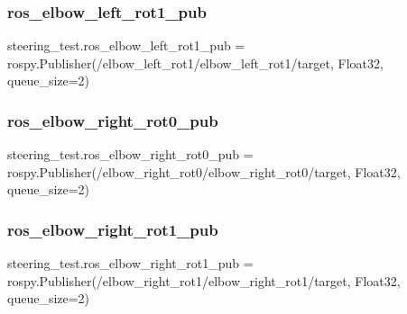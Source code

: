 \mbox{\label{namespacesteering__test_a5791cb7f60a031447e40dcdfdca9b56f}} 
\subsubsection{\texorpdfstring{ros\_elbow\_left\_rot1\_pub}{ros\_elbow\_left\_rot1\_pub}}
{\footnotesize\ttfamily steering\+\_\+test.\+ros\+\_\+elbow\+\_\+left\+\_\+rot1\+\_\+pub = rospy.\+Publisher(\textquotesingle{}/elbow\+\_\+left\+\_\+rot1/elbow\+\_\+left\+\_\+rot1/target\textquotesingle{}, Float32, queue\+\_\+size=2)}

\mbox{\label{namespacesteering__test_a8b72aa5250d03bc64a0ae00f7fb94e45}} 
\subsubsection{\texorpdfstring{ros\_elbow\_right\_rot0\_pub}{ros\_elbow\_right\_rot0\_pub}}
{\footnotesize\ttfamily steering\+\_\+test.\+ros\+\_\+elbow\+\_\+right\+\_\+rot0\+\_\+pub = rospy.\+Publisher(\textquotesingle{}/elbow\+\_\+right\+\_\+rot0/elbow\+\_\+right\+\_\+rot0/target\textquotesingle{}, Float32, queue\+\_\+size=2)}

\mbox{\label{namespacesteering__test_a532f906db02af05139ac166f139dcea7}} 
\subsubsection{\texorpdfstring{ros\_elbow\_right\_rot1\_pub}{ros\_elbow\_right\_rot1\_pub}}
{\footnotesize\ttfamily steering\+\_\+test.\+ros\+\_\+elbow\+\_\+right\+\_\+rot1\+\_\+pub = rospy.\+Publisher(\textquotesingle{}/elbow\+\_\+right\+\_\+rot1/elbow\+\_\+right\+\_\+rot1/target\textquotesingle{}, Float32, queue\+\_\+size=2)}

